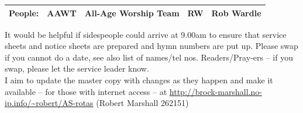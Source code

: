 \documentclass[10pt]{article}
\begin{document}
\begin{center}
\vspace{1em}
\begin{tabular}{|c|c|c|c|c|}\hline
{\bf People: } &
AAWT & All-Age Worship Team & %
RW & Rob Wardle\\%
     \hline
  \end{tabular}
\end{center}
\begin{minipage}{0.65\textwidth}
{\footnotesize It would be helpful if sidespeople 
could arrive at 9.00am to ensure that service sheets and notice sheets are 
prepared and hymn numbers are put up.
Please swap if you cannot do a date, see also list of names/tel nos.
Readers/Pray-ers -- if you swap, please let the service leader know.\\
I aim to update the master copy with changes as they
happen and make it available -- for those with internet access
\linebreak -- at
\url{http://brock-marshall.no-ip.info/~robert/AS-rotas}
(Robert Marshall 262151)}
\end{minipage}
\end{document}
